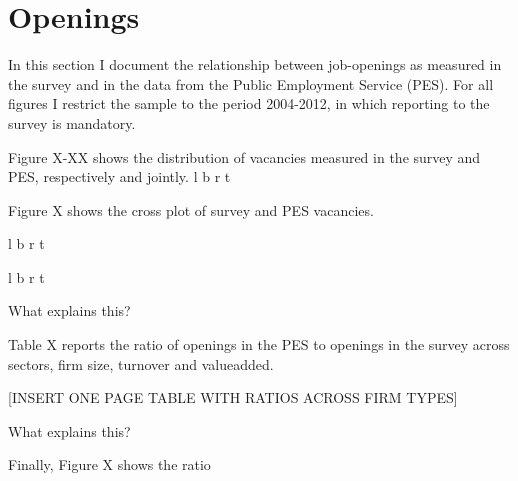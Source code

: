 \section{Openings}

In this section I document the relationship between job-openings as measured in the survey and in the data from the Public Employment Service (PES). For all figures I restrict the sample to the period 2004-2012, in which reporting to the survey is mandatory.

Figure X-XX shows the distribution of vacancies measured in the survey and PES, respectively and jointly. 
%
l b r t

Figure X shows the cross plot of survey and PES vacancies. 

l b r t

l b r t

What explains this?

Table X reports the ratio of openings in the PES to openings in the survey across sectors, firm size, turnover and valueadded.

[INSERT ONE PAGE TABLE WITH RATIOS ACROSS FIRM TYPES]

What explains this?

Finally, Figure X shows the ratio

